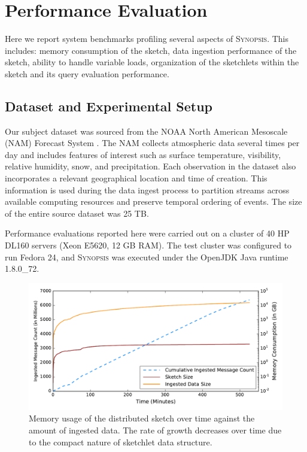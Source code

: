 \section{Performance Evaluation}
Here we report system benchmarks profiling several aspects of \textsc{Synopsis}. This includes: memory consumption of the sketch, data ingestion performance of the sketch, ability to handle variable loads, organization of the sketchlets within the sketch and its query evaluation performance.
\label{sec:performance}
\subsection{Dataset and Experimental Setup}
Our subject dataset was sourced from the NOAA North American Mesoscale (NAM) Forecast System \cite{noaa_nam}.  The NAM collects atmospheric data several times per day and includes features of interest such as surface temperature, visibility, relative humidity, snow, and precipitation. Each observation in the dataset also incorporates a relevant geographical location and time of creation. This information is used during the data ingest process to partition streams across available computing resources and preserve temporal ordering of events. The size of the entire source dataset was 25 TB.

Performance evaluations reported here were carried out on a cluster of 40 HP DL160 servers (Xeon E5620, 12 GB RAM). The test cluster was configured to run Fedora 24, and \textsc{Synopsis} was executed under the OpenJDK Java runtime 1.8.0\_72.
%
%
\begin{figure}[t!]
    \centerline{\includegraphics[width=\linewidth]{figures/ing-and-mem-usage.pdf}}
    \caption{Memory usage of the distributed sketch over time against the amount of ingested data. The rate of growth decreases over time due to the compact nature of sketchlet data structure.}
    \label{fig:dist-sketch-mem-usage}
\end{figure}
%
%
